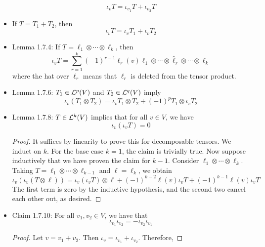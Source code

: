 \documentclass[../notes.tex]{subfiles}
\begin{document}
\begin{itemize}
    \begin{equation*}
        \iota_vT = \iota_{v_1}T+\iota_{v_2}T
    \end{equation*}
    \item If $T=T_1+T_2$, then
    \begin{equation*}
        \iota_vT = \iota_vT_1+\iota_vT_2
    \end{equation*}
    \item Lemma 1.7.4: If $T=\ell_1\otimes\cdots\otimes\ell_k$, then
    \begin{equation*}
        \iota_vT = \sum_{r=1}^k(-1)^{r-1}\ell_r(v)\ell_1\otimes\cdots\otimes\hat{\ell}_r\otimes\cdots\otimes\ell_k
    \end{equation*}
    where the hat over $\ell_r$ means that $\ell_r$ is deleted from the tensor product.
    \item Lemma 1.7.6: $T_1\in\lin[p]{V}$ and $T_2\in\lin[q]{V}$ imply
    \begin{equation*}
        \iota_v(T_1\otimes T_2) = \iota_vT_1\otimes T_2+(-1)^pT_1\otimes\iota_vT_2
    \end{equation*}
    \item Lemma 1.7.8: $T\in\lin[k]{V}$ implies that for all $v\in V$, we have
    \begin{equation*}
        \iota_v(\iota_vT) = 0
    \end{equation*}
    \begin{proof}
        It suffices by linearity to prove this for decomposable tensors. We induct on $k$. For the base case $k=1$, the claim is trivially true. Now suppose inductively that we have proven the claim for $k-1$. Consider $\ell_1\otimes\cdots\otimes\ell_k$. Taking $T=\ell_1\otimes\cdots\otimes\ell_{k-1}$ and $\ell=\ell_k$, we obtain
        \begin{equation*}
            \iota_v(\iota_v(T\otimes\ell)) = \iota_v(\iota_vT)\otimes\ell+(-1)^{k-2}\ell(v)\iota_vT+(-1)^{k-1}\ell(v)\iota_vT
        \end{equation*}
        The first term is zero by the inductive hypothesis, and the second two cancel each other out, as desired.
    \end{proof}
    \item Claim 1.7.10: For all $v_1,v_2\in V$, we have that
    \begin{equation*}
        \iota_{v_1}\iota_{v_2} = -\iota_{v_2}\iota_{v_1}
    \end{equation*}
    \begin{proof}
        Let $v=v_1+v_2$. Then $\iota_v=\iota_{v_1}+\iota_{v_2}$. Therefore,

\end{proof}
\end{itemize}
\end{document}
